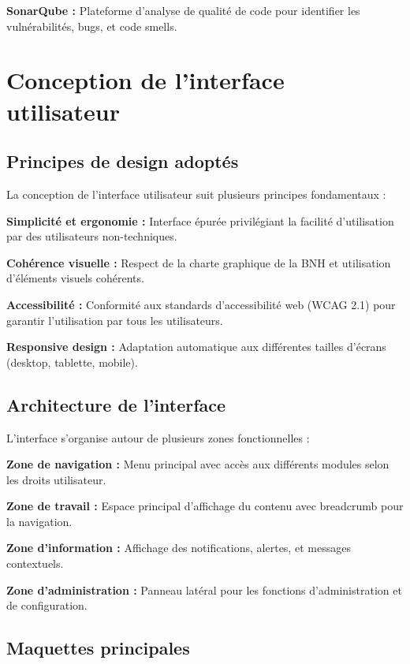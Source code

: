 \textbf{SonarQube :} Plateforme d'analyse de qualité de code pour identifier les vulnérabilités, bugs, et code smells.

\section{Conception de l'interface utilisateur}

\subsection{Principes de design adoptés}

La conception de l'interface utilisateur suit plusieurs principes fondamentaux :

\medskip

\textbf{Simplicité et ergonomie :} Interface épurée privilégiant la facilité d'utilisation par des utilisateurs non-techniques.

\textbf{Cohérence visuelle :} Respect de la charte graphique de la BNH et utilisation d'éléments visuels cohérents.

\textbf{Accessibilité :} Conformité aux standards d'accessibilité web (WCAG 2.1) pour garantir l'utilisation par tous les utilisateurs.

\textbf{Responsive design :} Adaptation automatique aux différentes tailles d'écrans (desktop, tablette, mobile).

\subsection{Architecture de l'interface}

L'interface s'organise autour de plusieurs zones fonctionnelles :

\medskip

\textbf{Zone de navigation :} Menu principal avec accès aux différents modules selon les droits utilisateur.

\textbf{Zone de travail :} Espace principal d'affichage du contenu avec breadcrumb pour la navigation.

\textbf{Zone d'information :} Affichage des notifications, alertes, et messages contextuels.

\textbf{Zone d'administration :} Panneau latéral pour les fonctions d'administration et de configuration.

\subsection{Maquettes principales}

